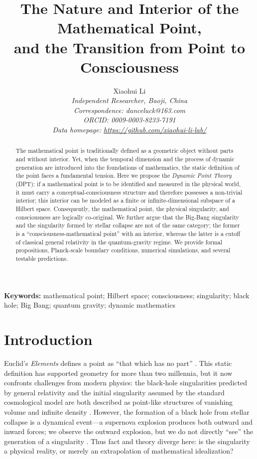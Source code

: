 \documentclass[11pt,a4paper]{article}
\title{\textbf{The Nature and Interior of the Mathematical Point,\\ and the Transition from Point to Consciousness}}
\author{Xiaohui Li\\
\textit{Independent Researcher, Baoji, China}\\
\textit{Correspondence: danceluck@163.com}\\
\textit{ORCID: 0009-0003-8233-7191}\\
\textit{Data homepage: \url{https://github.com/xiaohui-li-lab/}}}
\date{}
\theoremstyle{definition}
\begin{document}
\maketitle

\begin{abstract}
\noindent
The mathematical point is traditionally defined as a geometric object without parts and without interior. Yet, when the temporal dimension and the process of dynamic generation are introduced into the foundations of mathematics, the static definition of the point faces a fundamental tension. Here we propose the \textit{Dynamic Point Theory} (DPT): if a mathematical point is to be identified and measured in the physical world, it must carry a conceptual-consciousness structure and therefore possesses a non-trivial interior; this interior can be modeled as a finite or infinite-dimensional subspace of a Hilbert space. Consequently, the mathematical point, the physical singularity, and consciousness are logically co-original. We further argue that the Big-Bang singularity and the singularity formed by stellar collapse are not of the same category; the former is a ``consciousness-mathematical point'' with an interior, whereas the latter is a cutoff of classical general relativity in the quantum-gravity regime. We provide formal propositions, Planck-scale boundary conditions, numerical simulations, and several testable predictions.
\end{abstract}

\noindent\textbf{Keywords:} mathematical point; Hilbert space; consciousness; singularity; black hole; Big Bang; quantum gravity; dynamic mathematics

\section{Introduction}

Euclid's \textit{Elements} defines a point as ``that which has no part'' \cite{euclid_elements}. This static definition has supported geometry for more than two millennia, but it now confronts challenges from modern physics: the black-hole singularities predicted by general relativity and the initial singularity assumed by the standard cosmological model are both described as point-like structures of vanishing volume and infinite density \cite{hawking_penrose1966, penrose1965}. However, the formation of a black hole from stellar collapse is a dynamical event---a supernova explosion produces both outward and inward forces; we observe the outward explosion, but we do not directly ``see'' the generation of a singularity \cite{woosley_janka2005}. Thus fact and theory diverge here: is the singularity a physical reality, or merely an extrapolation of mathematical idealization?
\end{document}
